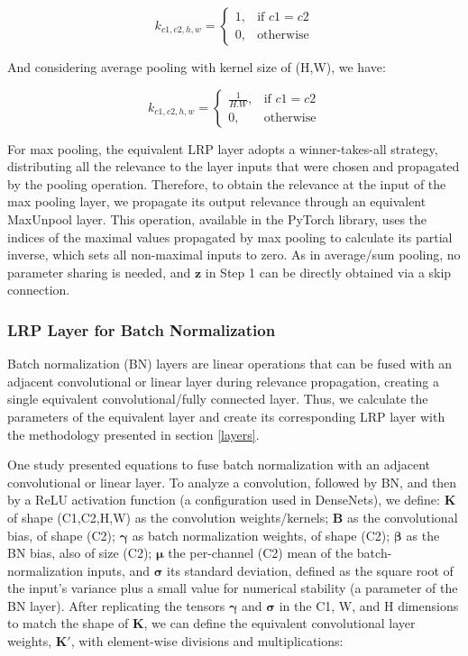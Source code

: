 \documentclass[fleqn,10pt]{wlscirep}
\begin{document}
{\begin{equation}
k_{c1,c2,h,w}=
\begin{cases}
1,& \text{if }c1=c2\\
0,&  \text{otherwise}
\end{cases}
\label{weights}
\end{equation}

And considering average pooling with kernel size of (H,W), we have:

\begin{equation}
k_{c1,c2,h,w}=
\begin{cases}
\frac{1}{H.W},& \text{if }c1=c2\\
0,&  \text{otherwise}
\end{cases}
\end{equation}

For max pooling, the equivalent LRP layer adopts a winner-takes-all strategy, distributing all the relevance to the layer inputs that were chosen and propagated by the pooling operation. Therefore, to obtain the relevance at the input of the max pooling layer, we propagate its output relevance through an equivalent MaxUnpool layer. This operation, available in the PyTorch library, uses the indices of the maximal values propagated by max pooling to calculate its partial inverse, which sets all non-maximal inputs to zero. As in average/sum pooling, no parameter sharing is needed, and $\bm{z}$ in Step 1 can be directly obtained via a skip connection.

\subsubsection{LRP Layer for Batch Normalization}
\label{BN}
Batch normalization (BN) layers are linear operations that can be fused with an adjacent convolutional or linear layer during relevance propagation, creating a single equivalent convolutional/fully connected layer. Thus, we calculate the parameters of the equivalent layer and create its corresponding LRP layer with the methodology presented in section \ref{layers}.

One study\cite{BNLRP} presented equations to fuse batch normalization with an adjacent convolutional or linear layer. To analyze a convolution, followed by BN, and then by a ReLU activation function (a configuration used in DenseNets), we define: $\bm{K}$ of shape (C1,C2,H,W) as the convolution weights/kernels; $\bm{B}$ as the convolutional bias, of shape (C2); $\bm{\gamma}$ as batch normalization weights, of shape (C2); $\bm{\beta}$ as the BN bias, also of size (C2); $\bm{\mu}$ the per-channel (C2) mean of the batch-normalization inputs, and $\bm{\sigma}$ its standard deviation, defined as the square root of the input's variance plus a small value for numerical stability (a parameter of the BN layer). After replicating the tensors $\bm{\gamma}$ and $\bm{\sigma}$ in the C1, W, and H dimensions to match the shape of $\bm{K}$, we can define the equivalent convolutional layer weights, $\bm{K'}$, with element-wise divisions and multiplications:

}
\end{document}
